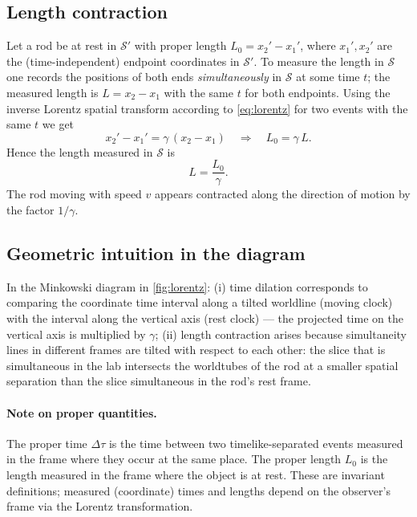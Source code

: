 \documentclass[12pt,
               open=any,
               twoside,
               a4paper,
               titlepage,
               bibliography=totoc,
               xcolor=dvipsnames,
               ]{scrartcl}
\theoremstyle{definition}
\theoremstyle{definition}
\begin{document}
			\subsection{Length contraction}
			\label{subsec:lengthcontraction}
			
				Let a rod be at rest in $\mathcal S'$ with proper length $L_0 = x_2' - x_1'$, where $x_1',x_2'$ are the (time-independent) endpoint coordinates in $\mathcal S'$. To measure the length in $\mathcal S$ one records the positions of both ends \emph{simultaneously} in $\mathcal S$ at some time $t$; the measured length is $L = x_2 - x_1$ with the same $t$ for both endpoints. Using the inverse Lorentz spatial transform according to \autoref{eq:lorentz} for two events with the same $t$ we get
				$$x_2' - x_1' = \gamma\,(x_2 - x_1) \quad\Rightarrow\quad L_0 = \gamma\,L.$$
				Hence the length measured in $\mathcal S$ is
				\begin{equation}
					\boxed{L = \frac{L_0}{\gamma}}.
					\label{eq:lengthcontraction}
				\end{equation}
				The rod moving with speed $v$ appears contracted along the direction of motion by the factor $1/\gamma$.
			
			\subsection{Geometric intuition in the diagram}
			\label{subsec:minkowskiinterpretation}
			
				In the Minkowski diagram in \autoref{fig:lorentz}: (i) time dilation corresponds to comparing the coordinate time interval along a tilted worldline (moving clock) with the interval along the vertical axis (rest clock) — the projected time on the vertical axis is multiplied by $\gamma$; (ii) length contraction arises because simultaneity lines in different frames are tilted with respect to each other: the slice that is simultaneous in the lab intersects the worldtubes of the rod at a smaller spatial separation than the slice simultaneous in the rod's rest frame.
			
				\paragraph{Note on proper quantities.}
					The proper time $\Delta\tau$ is the time between two timelike-separated events measured in the frame where they occur at the same place. The proper length $L_0$ is the length measured in the frame where the object is at rest. These are invariant definitions; measured (coordinate) times and lengths depend on the observer's frame via the Lorentz transformation.
		
\end{document}
